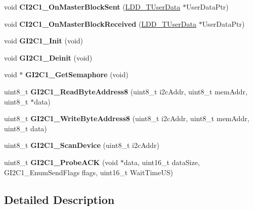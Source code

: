 \begin{DoxyCompactItemize}
\item 
\hypertarget{group___g_i2_c1__module_ga05687654128c49b7c4cc02028aa17a99}{void {\bfseries C\-I2\-C1\-\_\-\-On\-Master\-Block\-Sent} (\hyperlink{group___p_e___types__module_ga0b66a73f87238a782318aa0be7578e35}{L\-D\-D\-\_\-\-T\-User\-Data} $\ast$User\-Data\-Ptr)}\label{group___g_i2_c1__module_ga05687654128c49b7c4cc02028aa17a99}

\item 
\hypertarget{group___g_i2_c1__module_ga671887872c731a5156b03fd60de911f8}{void {\bfseries C\-I2\-C1\-\_\-\-On\-Master\-Block\-Received} (\hyperlink{group___p_e___types__module_ga0b66a73f87238a782318aa0be7578e35}{L\-D\-D\-\_\-\-T\-User\-Data} $\ast$User\-Data\-Ptr)}\label{group___g_i2_c1__module_ga671887872c731a5156b03fd60de911f8}

\item 
\hypertarget{group___g_i2_c1__module_ga930f855beaea30272451f81843a8efd5}{void {\bfseries G\-I2\-C1\-\_\-\-Init} (void)}\label{group___g_i2_c1__module_ga930f855beaea30272451f81843a8efd5}

\item 
\hypertarget{group___g_i2_c1__module_gab33db0d0bf6eb71464a420a4612fbc5c}{void {\bfseries G\-I2\-C1\-\_\-\-Deinit} (void)}\label{group___g_i2_c1__module_gab33db0d0bf6eb71464a420a4612fbc5c}

\item 
\hypertarget{group___g_i2_c1__module_ga2aeea800ba94535c256f548086daa5f8}{void $\ast$ {\bfseries G\-I2\-C1\-\_\-\-Get\-Semaphore} (void)}\label{group___g_i2_c1__module_ga2aeea800ba94535c256f548086daa5f8}

\item 
\hypertarget{group___g_i2_c1__module_gae572e3baa831d7412d4f010bb712fb1c}{uint8\-\_\-t {\bfseries G\-I2\-C1\-\_\-\-Read\-Byte\-Address8} (uint8\-\_\-t i2c\-Addr, uint8\-\_\-t mem\-Addr, uint8\-\_\-t $\ast$data)}\label{group___g_i2_c1__module_gae572e3baa831d7412d4f010bb712fb1c}

\item 
\hypertarget{group___g_i2_c1__module_ga1c0f54c788370a11f3ad1447c065fb50}{uint8\-\_\-t {\bfseries G\-I2\-C1\-\_\-\-Write\-Byte\-Address8} (uint8\-\_\-t i2c\-Addr, uint8\-\_\-t mem\-Addr, uint8\-\_\-t data)}\label{group___g_i2_c1__module_ga1c0f54c788370a11f3ad1447c065fb50}

\item 
\hypertarget{group___g_i2_c1__module_ga1432b1e1e6f44ea64c2fd2ee5c701108}{uint8\-\_\-t {\bfseries G\-I2\-C1\-\_\-\-Scan\-Device} (uint8\-\_\-t i2c\-Addr)}\label{group___g_i2_c1__module_ga1432b1e1e6f44ea64c2fd2ee5c701108}

\item 
\hypertarget{group___g_i2_c1__module_ga83a398532915b74153ba4645b3f19219}{uint8\-\_\-t {\bfseries G\-I2\-C1\-\_\-\-Probe\-A\-C\-K} (void $\ast$data, uint16\-\_\-t data\-Size, G\-I2\-C1\-\_\-\-Enum\-Send\-Flags flags, uint16\-\_\-t Wait\-Time\-U\-S)}\label{group___g_i2_c1__module_ga83a398532915b74153ba4645b3f19219}

\end{DoxyCompactItemize}


\subsection{Detailed Description}
